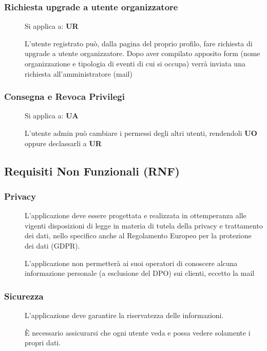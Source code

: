 \documentclass{article}
\let\origthesubsubsection\thesubsubsection
\begin{document}
\subsubsection{Richiesta upgrade a utente organizzatore} \label{rf_12}
\begin{description}
    \item[] Si applica a: \textbf{UR}
    \item[] L'utente registrato può, dalla pagina del proprio profilo, fare richiesta di upgrade a utente organizzatore. Dopo aver compilato apposito form (nome organizzazione e tipologia di eventi di cui si occupa) verrà inviata una richiesta all'amministratore (mail)
\end{description}
\subsubsection{Consegna e Revoca Privilegi} \label{rf_13}
\begin{description}
    \item[] Si applica a: \textbf{UA}
    \item[] L'utente admin può cambiare i permessi degli altri utenti, rendendoli \textbf{UO} oppure declassarli a \textbf{UR}
\end{description}
\clearpage
\renewcommand\thesubsubsection{\origthesubsubsection}
\subsection{Requisiti Non Funzionali (RNF)}
\renewcommand\thesubsubsection{RNF\arabic{subsubsection}}
\subsubsection{Privacy} \label{rnf_1}
\begin{description}
    \item[] L’applicazione deve essere progettata e realizzata in ottemperanza alle vigenti disposizioni di legge in materia di tutela della privacy e trattamento dei dati, nello specifico anche al Regolamento Europeo per la protezione dei dati (GDPR).
    \item[] L’applicazione non permetterà ai suoi operatori di conoscere alcuna informazione personale (a esclusione del DPO) sui clienti, eccetto la mail
\end{description}
\subsubsection{Sicurezza} \label{rnf_2}
\begin{description}
    \item[] L’applicazione deve garantire la riservatezza delle informazioni.
    \item[] È necessario assicurarsi che ogni utente veda e possa vedere solamente i propri dati.
\end{description}
\end{document}
